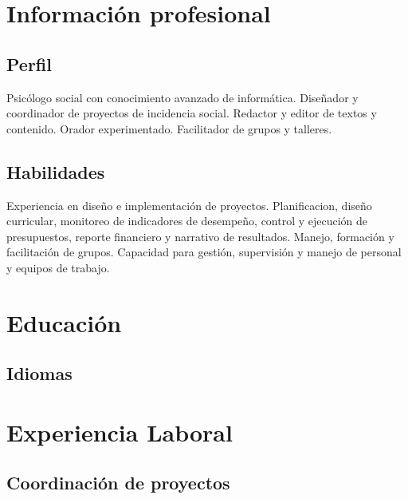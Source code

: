 \documentclass[xcolor=svgnames,color=DarkSlateGray]{komacv}
\begin{document}
\maketitle

\section{Información profesional}
\subsection{Perfil}
\raggedright
  Psicólogo social con conocimiento avanzado de informática. Diseñador y coordinador de proyectos de incidencia social. Redactor y editor de textos y contenido. Orador experimentado. Facilitador de grupos y talleres.
\subsection{Habilidades}
\raggedright
  Experiencia en diseño e implementación de proyectos. Planificacion, diseño curricular, monitoreo de indicadores de desempeño, control y ejecución de presupuestos, reporte financiero y narrativo de resultados. Manejo, formación y facilitación de grupos. Capacidad para gestión, supervisión y manejo de personal y equipos de trabajo.

\section{Educación}

\subsection{Idiomas}

\section{Experiencia Laboral}
\subsection{Coordinación de proyectos}
\end{document}
